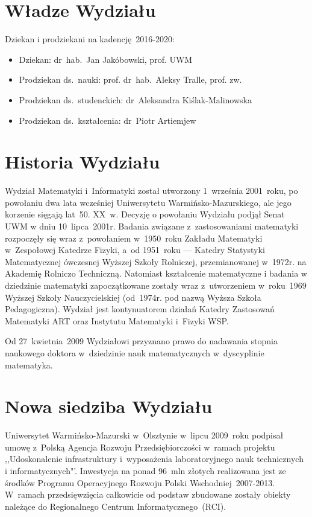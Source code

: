 \documentclass[a4paper,12pt]{article}
\begin{document}
\section{Władze Wydziału}
Dziekan i prodziekani na kadencję~2016-2020:
\begin{itemize}
\item{Dziekan: dr~hab.~Jan Jakóbowski, prof. UWM}
\item{Prodziekan ds.~nauki: prof. dr~hab.~Aleksy Tralle, prof. zw.}
\item{Prodziekan ds.~studenckich: dr~Aleksandra Kiślak-Malinowska}
\item{Prodziekan ds.~kształcenia: dr~Piotr Artiemjew}
\end{itemize}

\section{Historia Wydziału}
Wydział Matematyki i~Informatyki został utworzony 1~września 2001~roku, po powołaniu dwa lata wcześniej Uniwersytetu Warmińsko-Mazurskiego, ale jego korzenie sięgają lat~50. XX~w. Decyzję o powołaniu Wydziału podjął Senat UWM w dniu 10~lipca~2001r. Badania związane z~zastosowaniami matematyki rozpoczęły się wraz z~powołaniem w~1950~roku Zakładu Matematyki w~Zespołowej Katedrze Fizyki, a~od 1951~roku --- Katedry Statystyki Matematycznej ówczesnej Wyższej Szkoły Rolniczej, przemianowanej w~1972r. na Akademię Rolniczo Techniczną. Natomiast kształcenie matematyczne i badania w dziedzinie matematyki zapoczątkowane zostały wraz z~utworzeniem w~roku~1969 Wyższej Szkoły Nauczycielskiej (od~1974r. pod nazwą Wyższa Szkoła Pedagogiczna). Wydział jest kontynuatorem działań Katedry Zastosowań Matematyki ART oraz Instytutu Matematyki i~Fizyki WSP.

Od 27~kwietnia~2009 Wydziałowi przyznano prawo do nadawania stopnia naukowego doktora w~dziedzinie
nauk matematycznych w~dyscyplinie matematyka.

\section{Nowa siedziba Wydziału}
Uniwersytet Warmińsko-Mazurski w~Olsztynie w~lipcu 2009~roku podpisał umowę z~Polską Agencja Rozwoju Przedsiębiorczości w~ramach projektu ,,Udoskonalenie infrastruktury i~wyposażenia laboratoryjnego nauk technicznych i informatycznych"'. Inwestycja na ponad 96~mln złotych realizowana jest ze środków Programu Operacyjnego Rozwoju Polski Wschodniej~2007-2013. W~ramach przedsięwzięcia całkowicie od podstaw zbudowane zostały obiekty należące do Regionalnego Centrum Informatycznego~(RCI).
\end{document}
